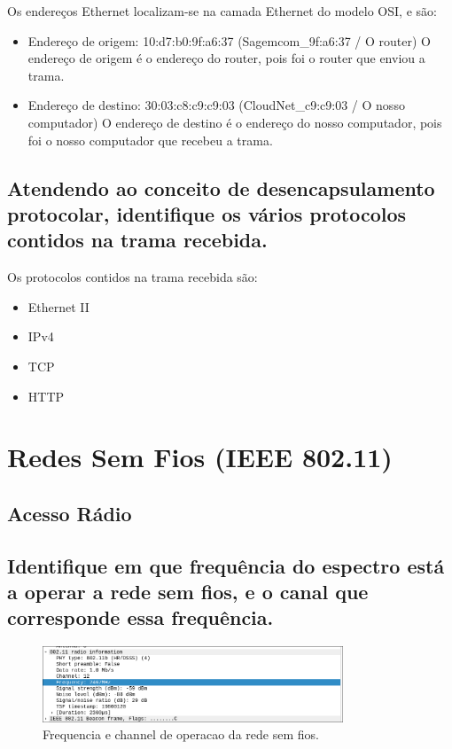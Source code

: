 \documentclass{article}
\begin{document}
Os endereços Ethernet localizam-se na camada Ethernet do modelo OSI, e são:
\begin{itemize}
    \item Endereço de origem: 10:d7:b0:9f:a6:37 (Sagemcom\_9f:a6:37 / O router) \linebreak
    O endereço de origem é o endereço do router, pois foi o router que enviou a trama.
    \item Endereço de destino: 30:03:c8:c9:c9:03 (CloudNet\_c9:c9:03 / O nosso computador) \linebreak
    O endereço de destino é o endereço do nosso computador, pois foi o nosso computador que recebeu a trama.
\end{itemize}

\subsection{Atendendo ao conceito de desencapsulamento protocolar, identifique os vários
protocolos contidos na trama recebida.}

Os protocolos contidos na trama recebida são:
\begin{itemize}
    \item Ethernet II
    \item IPv4
    \item TCP
    \item HTTP
\end{itemize}



\section{Redes Sem Fios (IEEE 802.11)}
\subsection*{Acesso Rádio}
\subsection{Identifique em que frequência do espectro está a operar a rede sem fios, e o canal que corresponde essa frequência.}

\begin{figure}[h]
    \centering
    \includegraphics[width=0.8\textwidth]{images/freq.png}
    \caption{\label{fig:freq}Frequencia e channel de operacao da rede sem fios.}
\end{figure}
\end{document}
